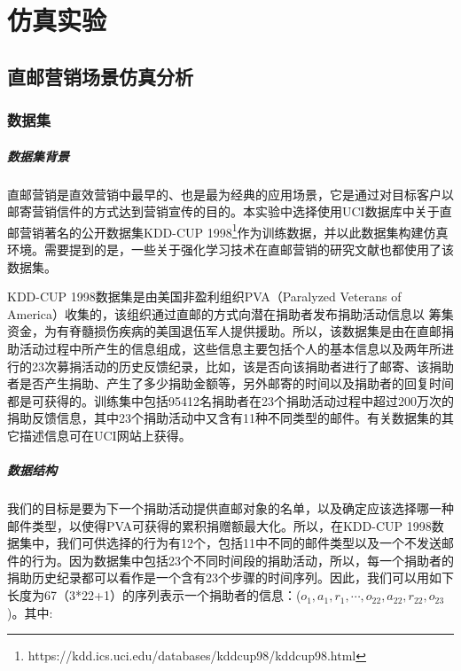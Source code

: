 \chapter{仿真实验}

\section{直邮营销场景仿真分析}


\subsection{数据集}

\paragraph{数据集背景}
直邮营销是直效营销中最早的、也是最为经典的应用场景，它是通过对目标客户以邮寄营销信件的方式达到营销宣传的目的。本实验中选择使用UCI数据库中关于直邮营销著名的公开数据集KDD-CUP 1998\footnote{https://kdd.ics.uci.edu/databases/kddcup98/kddcup98.html}作为训练数据，并以此数据集构建仿真环境。需要提到的是，一些关于强化学习技术在直邮营销的研究文献\citep{pednault2002sequential,tkachenko2015autonomous}也都使用了该数据集。

KDD-CUP 1998数据集是由美国非盈利组织PVA（Paralyzed Veterans of America）收集的，该组织通过直邮的方式向潜在捐助者发布捐助活动信息以
筹集资金，为有脊髓损伤疾病的美国退伍军人提供援助。所以，该数据集是由在直邮捐助活动过程中所产生的信息组成，这些信息主要包括个人的基本信息以及两年所进行的23次募捐活动的历史反馈纪录，比如，该是否向该捐助者进行了邮寄、该捐助者是否产生捐助、产生了多少捐助金额等，另外邮寄的时间以及捐助者的回复时间都是可获得的。训练集中包括95412名捐助者在23个捐助活动过程中超过200万次的捐助反馈信息，其中23个捐助活动中又含有11种不同类型的邮件。有关数据集的其它描述信息可在UCI网站上获得。

\paragraph{数据结构}
我们的目标是要为下一个捐助活动提供直邮对象的名单，以及确定应该选择哪一种邮件类型，以使得PVA可获得的累积捐赠额最大化。所以，在KDD-CUP 1998数据集中，我们可供选择的行为有12个，包括11中不同的邮件类型以及一个不发送邮件的行为。因为数据集中包括23个不同时间段的捐助活动，所以，每一个捐助者的捐助历史纪录都可以看作是一个含有23个步骤的时间序列。因此，我们可以用如下长度为67（3*22+1）的序列表示一个捐助者的信息：($o_{1}, a_{1}, r_{1},\cdots,o_{22}, a_{22}, r_{22}, o_{23}$)。其中:

